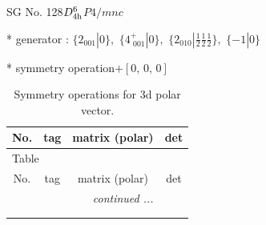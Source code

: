 \documentclass[fleqn,8pt]{jsarticle}
\begin{document}
\setcounter{MaxMatrixCols}{32}

\renewcommand{\tablename}{Table~}
\renewcommand{\figurename}{Figure~}
\begin{center}
\LARGE
SG No. 128\quad$D_{\rm 4h}^{6}$\quad$P4/mnc$\quad[ tetragonal ]
\end{center}

* generator : $\{2{}_{001}|0\},\,\,\{4^{+}_{\,\,001}|0\},\,\,\{2{}_{010}|\frac{1}{2} \frac{1}{2} \frac{1}{2}\},\,\,\{-1|0\}$

* symmetry operation\quad$+\left[ 0,\, 0,\, 0 \right]$
\renewcommand{\arraystretch}{1.3}
\begin{longtable}{cccc}
\caption{Symmetry operations for 3d polar vector.}
 \\
 \hline \hline
No. & tag & matrix (polar) & det \\ \hline \endfirsthead

\multicolumn{3}{l}{\tablename\ \thetable{}} \\
 \hline \hline
No. & tag & matrix (polar) & det \\ \hline \endhead

 \hline \hline
\multicolumn{3}{r}{\footnotesize\it continued ...} \\ \endfoot

 \hline \hline
\multicolumn{3}{r}{} \\ \endlastfoot


\end{longtable}
\end{document}
